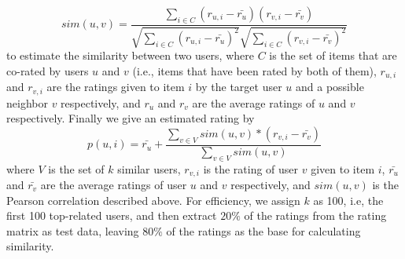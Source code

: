 $$ sim(u,v) = \frac{\sum_{i\in C}(r_{u,i}-\bar{r_u})(r_{v,i}-\bar{r_v})}{\sqrt{\sum_{i\in C}(r_{u,i}-\bar{r_u})^2}\sqrt{\sum_{i\in C}(r_{v,i}-\bar{r_v})^2}} $$
to estimate the similarity between two users, where $C$ is the set of items that are co-rated by users $u$ and $v$ (i.e., items
that have been rated by both of them), $r_{u,i}$ and $r_{v,i}$ are the ratings given to item $i$ by the target user $u$ and a possible neighbor $v$ respectively, and $r_u$ and $r_v$ are the average ratings of $u$ and $v$ respectively. Finally we give an estimated rating by $$p(u,i) = \bar{r_u} + \frac{\sum_{v\in V}sim(u,v)*(r_{v,i}-\bar{r_v})}{\sum_{v\in V}sim(u,v)}$$
where $V$ is the set of $k$ similar users, $r_{v,i}$ is the rating of user $v$ given to item $i$, $\bar{r_u}$ and $\bar{r_v}$ are the average ratings of user $u$ and $v$ respectively, and $sim(u, v)$ is the Pearson correlation described above.
For efficiency, we assign $k$ as 100, i.e, the first 100 top-related users, and then extract $20\%$ of the ratings from the rating matrix as test data, leaving $80\%$ of the ratings as the base for calculating similarity.
